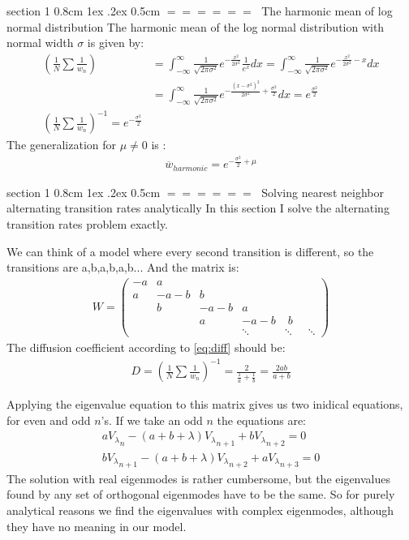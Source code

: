 \documentclass[onecolumn,fleqn,notitlepage,secnumarabic]{revtex4}
\makeatletter
\def\section{%
  \@startsection
    {section}%
    {1}%
    {\z@}%
    {0.8cm \@plus1ex \@minus .2ex}%
    {0.5cm}%
    {\Large\bf $=\!=\!=\!=\!=\!=\;$}%
}%
\makeatother
\begin{document}
\section{The harmonic mean of log normal distribution}
The harmonic mean of the log normal distribution with normal width $\sigma$ is given by:
\begin{align}
\left(\frac{1}{N}\sum\frac{1}{w_n}\right)&= \int_{-\infty}^\infty \frac{1}{\sqrt{2\pi\sigma^2}}e^{-\frac{x^2}{2\sigma^2}} \frac{1}{e^x} dx  = \int_{-\infty}^\infty \frac{1}{\sqrt{2\pi\sigma^2}}e^{-\frac{x^2}{2\sigma^2}-x} dx \\
&= \int_{-\infty}^\infty \frac{1}{\sqrt{2\pi\sigma^2}}e^{-\frac{\left(x-\sigma^2\right)^2}{2\sigma^2}+\frac{\sigma^2}{2}} dx = e^{\frac{\sigma^2}{2}}\\
\left(\frac{1}{N}\sum\frac{1}{w_n}\right)^{-1} = e^{-\frac{\sigma^2}{2}}
\end{align}
The generalization for $\mu\neq 0$ is :
\begin{align}
\overline{w}_{harmonic} = e^{-\frac{\sigma^2}{2}+\mu}
\end{align}

\section{Solving nearest neighbor alternating transition rates analytically}
In this section I solve the alternating transition rates problem exactly.

We can think of a model where every second transition is different, so the transitions are a,b,a,b,a,b... And the matrix is:
\begin{align}
W = 
\begin{pmatrix}
-a  & a \\
a  & -a-b &  b \\
 & b & -a-b &  a \\
& & a & -a-b & \; b \\
& & & \ddots &\ddots&\;\;\ddots
\end{pmatrix}
\end{align}
The diffusion coefficient according to \ref{eq:diff} should be:
\begin{align}\label{eq:D_alter}
D = \left(\frac{1}{N}\sum\frac{1}{w_n}\right)^{-1} = \frac{2}{\frac{1}{a} + \frac{1}{b}} = \frac{2ab}{a+b}
\end{align}

Applying the eigenvalue equation to this matrix gives us two inidical equations, for even and odd $n$'s. If we take an odd $n$ the equations are:
\begin{align}
a {V_\lambda}_n - (a+b+\lambda){V_\lambda}_{n+1} + b {V_\lambda}_{n+2} =0  \\
b {V_\lambda}_{n+1} - (a+b+\lambda){V_\lambda}_{n+2} + a {V_\lambda}_{n+3} =0 
\end{align}
The solution with real eigenmodes is rather cumbersome, but the eigenvalues found by any set of orthogonal eigenmodes have to be the same. So for purely analytical reasons we find the eigenvalues with complex eigenmodes, although they have no meaning in our model.
\end{document}
